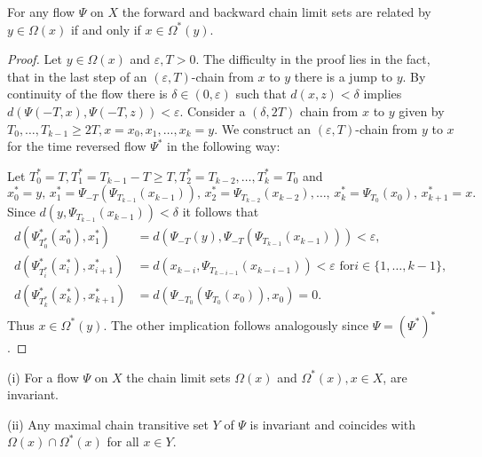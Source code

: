 \documentclass{siamltex}%
\begin{document}
\begin{proposition}
\label{LemCLSAtReverseTime}For any flow $\Psi$ on $X$ the forward and backward
chain limit sets are related by $y\in\Omega(x)$ if and only if $x\in
\Omega^{\ast}(y)$.
\end{proposition}

\begin{proof}
Let $y\in\Omega(x)$ and $\varepsilon,T>0$. The difficulty in the proof lies in
the fact, that in the last step of an $(\varepsilon,T)$-chain from $x$ to $y$
there is a jump to $y$. By continuity of the flow there is $\delta
\in(0,\varepsilon)$ such that $d(x,z)<\delta$ implies $d(\Psi(-T,x),\Psi
(-T,z))<\varepsilon$. Consider a $(\delta,2T)$ chain from $x$ to $y$ given by
$T_{0},\ldots,T_{k-1}\geq2T,x=x_{0},x_{1},\ldots,x_{k}=y$. We construct an
$(\varepsilon,T)$-chain from $y$ to $x$ for the time reversed flow $\Psi
^{\ast}$ in the following way:

Let $T_{0}^{\ast}=T,T_{1}^{\ast}=T_{k-1}-T\geq T,T_{2}^{\ast}=T_{k-2}%
,\ldots,T_{k}^{\ast}=T_{0}$ and%
\[
x_{0}^{\ast}=y,\,x_{1}^{\ast}=\Psi_{-T}\left(  \Psi_{T_{k-1}}(x_{k-1})\right)
,\,x_{2}^{\ast}=\Psi_{T_{k-2}}(x_{k-2}),\ldots,\,x_{k}^{\ast}=\Psi_{T_{0}%
}(x_{0}),\,x_{k+1}^{\ast}=x.
\]
Since $d(y,\Psi_{T_{k-1}}(x_{k-1}))<\delta$ it follows that
\begin{align*}
d\left(  \Psi_{T_{0}^{\ast}}^{\ast}(x_{0}^{\ast}),x_{1}^{\ast}\right)   &
=d\left(  \Psi_{-T}(y),\Psi_{-T}\left(  \Psi_{T_{k-1}}(x_{k-1})\right)
\right)  <\varepsilon,\\
d\left(  \Psi_{T_{i}^{\ast}}^{\ast}(x_{i}^{\ast}),x_{i+1}^{\ast}\right)   &
=d\left(  x_{k-i},\Psi_{T_{k-i-1}}(x_{k-i-1})\right)  <\varepsilon\text{ for
}i\in\{1,\ldots,k-1\},\\
d\left(  \Psi_{T_{k}^{\ast}}^{\ast}(x_{k}^{\ast}),x_{k+1}^{\ast}\right)   &
=d\left(  \Psi_{-T_{0}}(\Psi_{T_{0}}(x_{0})),x_{0}\right)  =0.
\end{align*}
Thus $x\in\Omega^{\ast}(y)$. The other implication follows analogously since
$\Psi=(\Psi^{\ast})^{\ast}$.
\end{proof}

\begin{proposition}
\label{Proposition_flow_inv}(i) For a flow $\Psi$ on $X$ the chain limit sets
$\Omega(x)$ and $\Omega^{\ast}(x),x\in X$, are invariant.

(ii) Any maximal chain transitive set $Y$ of $\Psi$ is invariant and coincides
with $\Omega(x)\cap\Omega^{\ast}(x)$ for all $x\in Y$.
\end{proposition}
\end{document}
